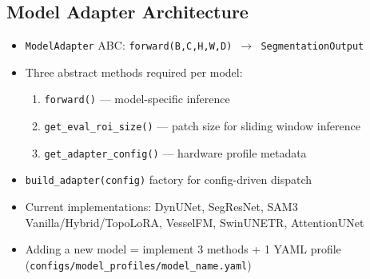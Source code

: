 
\subsection{Model Adapter Architecture}
\begin{itemize}
  \item \texttt{ModelAdapter} ABC: \texttt{forward(B,C,H,W,D) $\to$ SegmentationOutput}
  \item Three abstract methods required per model:
    \begin{enumerate}
      \item \texttt{forward()} --- model-specific inference
      \item \texttt{get\_eval\_roi\_size()} --- patch size for sliding window inference
      \item \texttt{get\_adapter\_config()} --- hardware profile metadata
    \end{enumerate}
  \item \texttt{build\_adapter(config)} factory for config-driven dispatch
  \item Current implementations: DynUNet, SegResNet, SAM3 Vanilla/Hybrid/TopoLoRA,
        VesselFM, SwinUNETR, AttentionUNet
  \item Adding a new model = implement 3 methods + 1 YAML profile
        (\texttt{configs/model\_profiles/model\_name.yaml})
\end{itemize}


